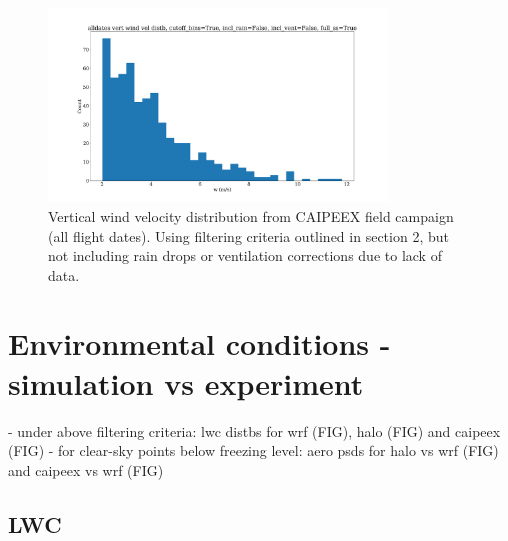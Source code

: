 \documentclass{article}
\begin{document}
\begin{figure}[ht]
    \centering
    \includegraphics[width=9cm]{revcaipeex/v10_w_hist_alldates_figure.png}
    \caption{Vertical wind velocity distribution from CAIPEEX field campaign (all flight dates). Using filtering criteria outlined in section 2, but not including rain drops or ventilation corrections due to lack of data.}
    \label{caipeexwhist}
\end{figure}

\section{Environmental conditions - simulation vs experiment}
- under above filtering criteria: lwc distbs for wrf (FIG), halo (FIG) and caipeex (FIG)
- for clear-sky points below freezing level: aero psds for halo vs wrf (FIG) and caipeex vs wrf (FIG)

\subsection{LWC}
\end{document}
